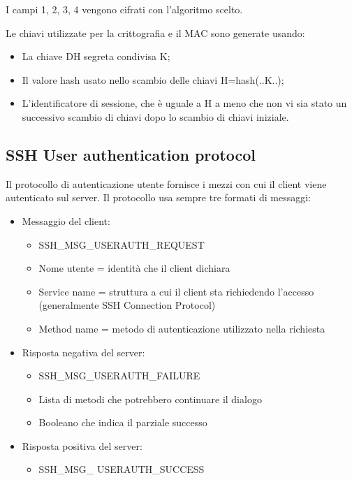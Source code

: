 I campi 1, 2, 3, 4 vengono cifrati con l'algoritmo scelto.

Le chiavi utilizzate per la crittografia e il MAC sono generate usando:
\begin{itemize}
    \item La chiave DH segreta condivisa K;
	\item Il valore hash usato nello scambio delle chiavi H=hash(..K..);
    \item L'identificatore di sessione, che è uguale a H a meno che non vi sia stato un successivo scambio di chiavi dopo lo scambio di chiavi iniziale.
\end{itemize}

\subsection{SSH User authentication protocol}

Il protocollo di autenticazione utente fornisce i mezzi con cui il client viene autenticato sul server. Il protocollo usa sempre tre formati di messaggi:
\begin{itemize}
    \item Messaggio del client:
	\begin{itemize}
	    \item SSH\_MSG\_USERAUTH\_REQUEST
		\item Nome utente = identità che il client dichiara
		\item Service name = struttura a cui il client sta richiedendo l'accesso (generalmente SSH Connection Protocol)
		\item Method name = metodo di autenticazione utilizzato nella richiesta
	\end{itemize}
	\item Risposta negativa del server:
	\begin{itemize}
	    \item SSH\_MSG\_USERAUTH\_FAILURE
		\item Lista di metodi che potrebbero continuare il dialogo
		\item Booleano che indica il parziale successo
	\end{itemize}
	\item Risposta positiva del server:
	\begin{itemize}
	    \item SSH\_MSG\_ USERAUTH\_SUCCESS
	\end{itemize}
\end{itemize}

